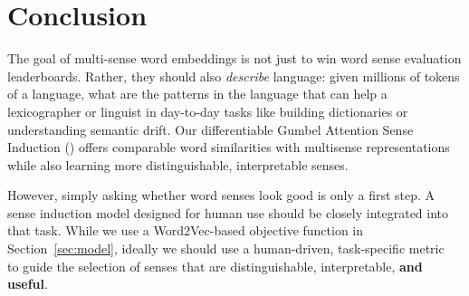 \section{Conclusion}

The goal of multi-sense word embeddings is not just to win word sense
evaluation leaderboards. Rather, they should also \emph{describe}
language: given millions of tokens of a language, what are the
patterns in the language that can help a lexicographer or linguist in
day-to-day tasks like building dictionaries or understanding semantic
drift.  Our differentiable Gumbel Attention Sense Induction (\gasi{})
offers comparable word similarities with multisense representations
while also learning more distinguishable, interpretable senses.  

However, simply asking whether word senses look good is only a first
step.
A sense induction model designed for human use should be closely
integrated into that task.
While we use a Word2Vec-based objective function in
Section~\ref{sec:model}, ideally we should use a human-driven,
task-specific metric~\citep{feng-19} to guide the selection of senses
that are distinguishable, interpretable, {\bf and useful}.
 
